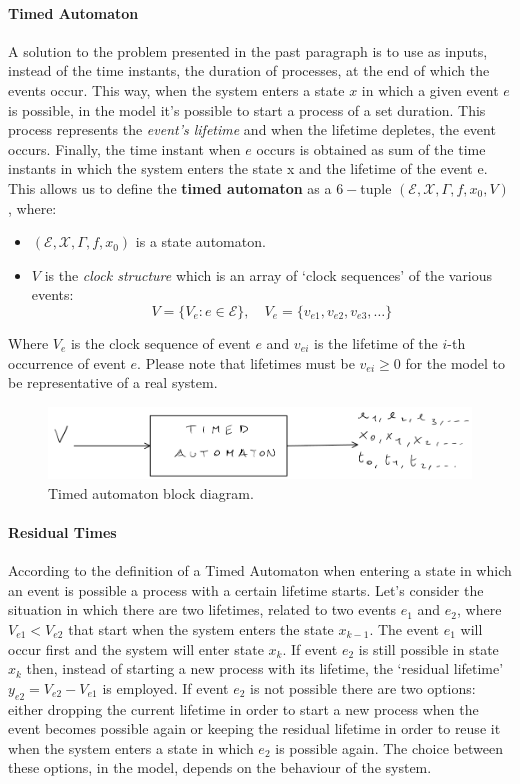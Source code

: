 \documentclass[12pt,a4paper]{article}
\begin{document}
\paragraph{Timed Automaton}
A solution to the problem presented in the past paragraph is to use as inputs, instead of the time instants, the duration of processes, at the end of which the events occur. This way, when the system enters a state $x$ in which a given event $e$ is possible, in the model it’s possible to start a process of a set duration. This process represents the \textit{event's lifetime} and when the lifetime depletes, the event occurs. Finally, the time instant when $e$ occurs is obtained as sum of the time instants in which the system enters the state x and the lifetime of the event e.
This allows us to define the \textbf{timed automaton} as a $6-$tuple $(\mathcal{E},\mathcal{X},\Gamma,f,x_0,V)$, where: 
\begin{itemize}
\item $(\mathcal{E},\mathcal{X},\Gamma,f,x_0)$ is a state automaton. 
\item $V$ is the \textit{clock structure} which is an array of `clock sequences’ of the various events:
$$
V=\{V_e : e\in\mathcal{E}\}, \quad V_e=\{v_{e1}, v_{e2}, v_{e3},\dots\}
$$
\end{itemize}	
\noindent
Where $V_e$ is the clock sequence of event $e$ and $v_{ei}$ is the lifetime of the $i$-th occurrence of event $e$. Please note that lifetimes must be $v_{ei} \ge 0$ for the model to be representative of a real system.

\begin{figure}[H]
	\centering
	\includegraphics[width=\textwidth]{IMG/timedAut.png}
	\caption{Timed automaton block diagram.}
	\label{fig:timedAut}
\end{figure}

\paragraph{Residual Times} According to the definition of a Timed Automaton when entering a state in which an event is possible a process with a certain lifetime starts. Let’s consider the situation in which there are two lifetimes, related to two events $e_1$ and $e_2$, where $V_{e1}<V_{e2}$ that start when the system enters the state $x_{k-1}$. The event $e_1$ will occur first and the system will enter state $x_k$. If event $e_2$ is still possible in state $x_k$ then, instead of starting a new process with its lifetime, the `residual lifetime’ $y_{e2}=V_{e2}-V_{e1}$ is employed. If event $e_2$ is not possible there are two options: either dropping the current lifetime in order to start a new process when the event becomes possible again or keeping the residual lifetime in order to reuse it when the system enters a state in which $e_2$ is possible again. The choice between these options, in the model, depends on the behaviour of the system.
\end{document}
